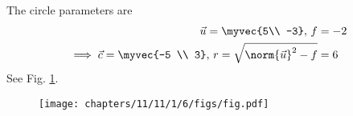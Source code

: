 The circle parameters are
\begin{align}
 \vec{u}=\myvec{5\\ -3},\,
 f&=-2\\
\implies \vec{c}=\myvec{-5 \\ 3},\,
	r=\sqrt{\norm{\vec{u}}^2-f}
&= 6
\end{align}
See Fig. 
\ref{fig:chapters/11/11/1/6/Fig1}.
\begin{figure}[H]
	\begin{center} 
	   \texttt{[image: chapters/11/11/1/6/figs/fig.pdf]}
	\end{center}
\caption{}
\label{fig:chapters/11/11/1/6/Fig1}
\end{figure}


